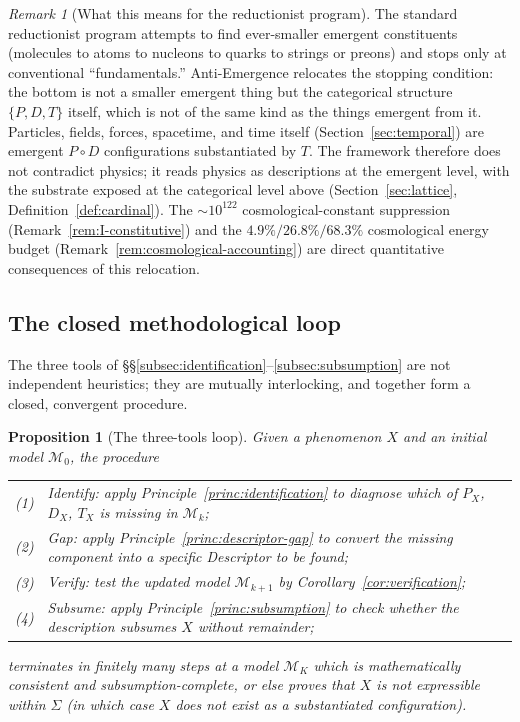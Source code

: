 \documentclass[11pt,a4paper]{article}
\newtheorem{proposition}[theorem]{Proposition}
\theoremstyle{definition}
\theoremstyle{remark}
\newtheorem{remark}[theorem]{Remark}
\begin{document}
\begin{remark}[What this means for the reductionist program]\label{rem:reductionism-inversion}
The standard reductionist program attempts to find ever-smaller emergent constituents (molecules to atoms to nucleons to quarks to strings or preons) and stops only at conventional ``fundamentals.'' Anti-Emergence relocates the stopping condition: the bottom is not a smaller emergent thing but the categorical structure $\{P,D,T\}$ itself, which is not of the same kind as the things emergent from it. Particles, fields, forces, spacetime, and time itself (Section~\ref{sec:temporal}) are emergent $P\circ D$ configurations substantiated by $T$. The framework therefore does not contradict physics; it reads physics as descriptions at the emergent level, with the substrate exposed at the categorical level above (Section~\ref{sec:lattice}, Definition~\ref{def:cardinal}). The $\sim 10^{122}$ cosmological-constant suppression (Remark~\ref{rem:I-constitutive}) and the $4.9\%/26.8\%/68.3\%$ cosmological energy budget (Remark~\ref{rem:cosmological-accounting}) are direct quantitative consequences of this relocation.
\end{remark}

\subsection{The closed methodological loop}\label{subsec:loop}

The three tools of \S\S\ref{subsec:identification}--\ref{subsec:subsumption} are not independent heuristics; they are mutually interlocking, and together form a closed, convergent procedure.

\begin{proposition}[The three-tools loop]\label{prop:loop}
Given a phenomenon $X$ and an initial model $\mathcal{M}_{0}$, the procedure
\begin{center}
\begin{tabularx}{\textwidth}{rX}
(1) & Identify: apply Principle~\ref{princ:identification} to diagnose which of $P_{X}$, $D_{X}$, $T_{X}$ is missing in $\mathcal{M}_{k}$;\\
(2) & Gap: apply Principle~\ref{princ:descriptor-gap} to convert the missing component into a specific Descriptor to be found;\\
(3) & Verify: test the updated model $\mathcal{M}_{k+1}$ by Corollary~\ref{cor:verification};\\
(4) & Subsume: apply Principle~\ref{princ:subsumption} to check whether the description subsumes $X$ without remainder;
\end{tabularx}
\end{center}
terminates in finitely many steps at a model $\mathcal{M}_{K}$ which is mathematically consistent and subsumption-complete, or else proves that $X$ is not expressible within $\Sigma$ (in which case $X$ does not exist as a substantiated configuration).
\end{proposition}
\end{document}
